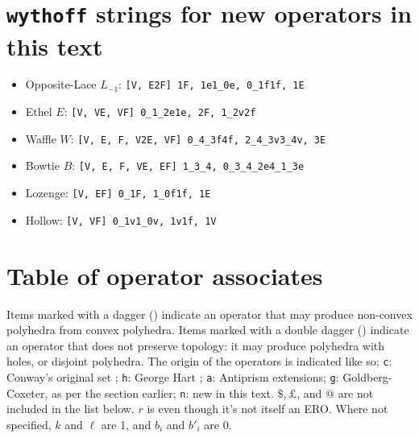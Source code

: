 \documentclass{amsart}[12pt]
\begin{document}



\appendix
\section{\texttt{wythoff} strings for new operators in this text}
\begin{itemize}
  \item Opposite-Lace $L_{-1}$: \texttt{[V, E2F] 1F, 1e1\_0e, 0\_1f1f, 1E}
  \item Ethel $E$: \texttt{[V, VE, VF] 0\_1\_2e1e, 2F, 1\_2v2f}
  \item Waffle $W$: \texttt{[V, E, F, V2E, VF] 0\_4\_3f4f, 2\_4\_3v3\_4v, 3E}
  \item Bowtie $B$: \texttt{[V, E, F, VE, EF] 1\_3\_4, 0\_3\_4\_2e4\_1\_3e}
  \item Lozenge: \texttt{[V, EF] 0\_1F, 1\_0f1f, 1E}
  \item Hollow: \texttt{[V, VF] 0\_1v1\_0v, 1v1f, 1V}
\end{itemize}

\section{Table of operator associates}

Items marked with a dagger (\dag) indicate an operator that may produce
non-convex polyhedra from convex polyhedra. Items marked with a
double dagger (\ddag) indicate an operator that does not preserve topology:
it may produce polyhedra with holes, or disjoint polyhedra.
The origin of the operators is indicated like so;
\texttt{c}: Conway's original set \cite{conway};
\texttt{h}: George Hart \cite{hart00}\cite{hart98};
\texttt{a}: Antiprism extensions\cite{antiprism};
\texttt{g}: Goldberg-Coxeter, as per the section earlier;
\texttt{n}: new in this text.
$\$, \pounds$, and $@$ are not included in the list below. $r$ is even though
it's not itself an ERO. Where not specified, $k$ and $\ell$ are 1, and $b_i$
and $b'_i$ are 0.
\end{document}
